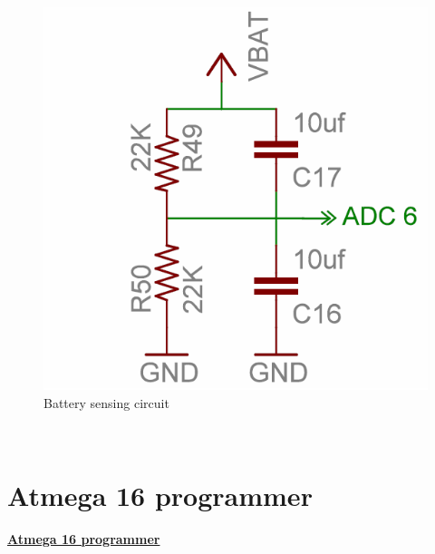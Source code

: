 \documentclass[a4paper,12pt,oneside]{book}
\begin{document}
	\hfill\\
	\begin{figure}[h!]
		\caption{Battery sensing circuit}
		\includegraphics[width=\textwidth]{./HardwareManual/battery_voltage_sensor.png}
	\end{figure}	
	\hfill\\
	\newpage
	
			\chapter[Atmega 16 programmer]{Atmega 16 programmer}
	\underline{\textbf{\Large{Atmega 16 programmer}}}
	
\end{document}
